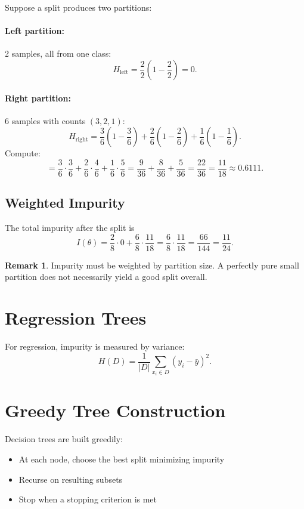 \documentclass[12pt,oneside]{book}
\numberwithin{equation}{section}
\theoremstyle{definition}
\newtheorem{remark}{Remark}[section]
\theoremstyle{plain}
\theoremstyle{remark}
\begin{document}
Suppose a split produces two partitions:

\paragraph{Left partition:} 2 samples, all from one class:
\[
H_{\text{left}}
=
\frac{2}{2}(1-\frac{2}{2})=0.
\]

\paragraph{Right partition:} 6 samples with counts $(3,2,1)$:
\[
H_{\text{right}}
=
\frac{3}{6}\left(1-\frac{3}{6}\right)
+
\frac{2}{6}\left(1-\frac{2}{6}\right)
+
\frac{1}{6}\left(1-\frac{1}{6}\right).
\]
Compute:
\[
=
\frac{3}{6}\cdot\frac{3}{6}
+
\frac{2}{6}\cdot\frac{4}{6}
+
\frac{1}{6}\cdot\frac{5}{6}
=
\frac{9}{36}
+
\frac{8}{36}
+
\frac{5}{36}
=
\frac{22}{36}
=
\frac{11}{18}
\approx 0.6111.
\]

\subsection{Weighted Impurity}

The total impurity after the split is
\[
I(\theta)
=
\frac{2}{8}\cdot 0
+
\frac{6}{8}\cdot \frac{11}{18}
=
\frac{6}{8}\cdot \frac{11}{18}
=
\frac{66}{144}
=
\frac{11}{24}.
\]

\begin{remark}
Impurity must be weighted by partition size. A perfectly pure small partition does not necessarily yield a good split overall.
\end{remark}

\section{Regression Trees}

For regression, impurity is measured by variance:
\[
H(D)
=
\frac{1}{|D|}
\sum_{x_i \in D}
(y_i-\bar{y})^2.
\]

\section{Greedy Tree Construction}

Decision trees are built greedily:
\begin{itemize}
    \item At each node, choose the best split minimizing impurity
    \item Recurse on resulting subsets
    \item Stop when a stopping criterion is met
\end{itemize}
\end{document}
